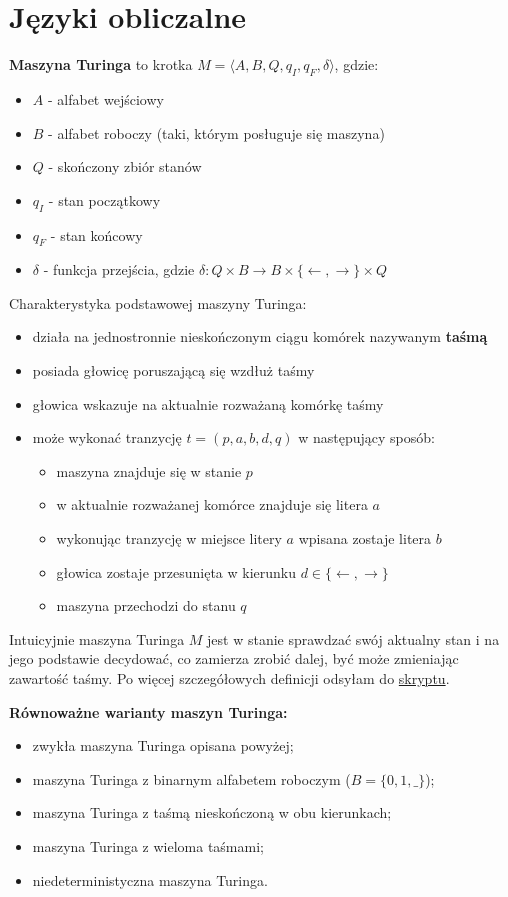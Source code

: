 \section{Języki obliczalne}
\textbf{Maszyna Turinga} to krotka $M = \langle A, B, Q, q_I, q_F, \delta \rangle$, gdzie:
\begin{itemize}
    \item $A$ - alfabet wejściowy
    \item $B$ - alfabet roboczy (taki, którym posługuje się maszyna)
    \item $Q$ - skończony zbiór stanów
    \item $q_I$ - stan początkowy
    \item $q_F$ - stan końcowy
    \item $\delta$ - funkcja przejścia, gdzie $\delta: Q \times B \to B \times \{\xleftarrow{}, \xrightarrow{} \} \times Q$
\end{itemize}
Charakterystyka podstawowej maszyny Turinga:
\begin{itemize}
    \item działa na jednostronnie nieskończonym ciągu komórek nazywanym \textbf{taśmą}
    \item posiada głowicę poruszającą się wzdłuż taśmy
    \item głowica wskazuje na aktualnie rozważaną komórkę taśmy
    \item może wykonać tranzycję $t = (p, a, b, d, q)$ w następujący sposób:
    \begin{itemize}
        \item maszyna znajduje się w stanie $p$
        \item w aktualnie rozważanej komórce znajduje się litera $a$
        \item wykonując tranzycję w miejsce litery $a$ wpisana zostaje litera $b$
        \item głowica zostaje przesunięta w kierunku $d \in \{\xleftarrow{}, \xrightarrow{}\}$
        \item maszyna przechodzi do stanu $q$
    \end{itemize}
\end{itemize}
Intuicyjnie maszyna Turinga $M$ jest w stanie sprawdzać swój aktualny stan i na jego podstawie decydować, co zamierza zrobić dalej, być może zmieniając zawartość taśmy. Po więcej szczegółowych definicji odsyłam do \href{https://www.mimuw.edu.pl/~szymtor/jao/skrypt.pdf#chapter.4}{skryptu}.

\textbf{Równoważne warianty maszyn Turinga:}
\begin{itemize}
    \item zwykła maszyna Turinga opisana powyżej;
    \item maszyna Turinga z binarnym alfabetem roboczym ($B = \{0, 1, \_\}$);
    \item maszyna Turinga z taśmą nieskończoną w obu kierunkach;
    \item maszyna Turinga z wieloma taśmami;
    \item niedeterministyczna maszyna Turinga.
\end{itemize}

